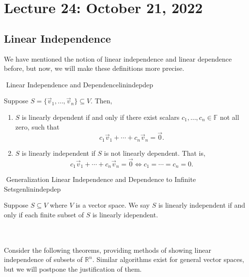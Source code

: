 \pagebreak

\section{Lecture 24: October 21, 2022}

    \subsection{Linear Independence}

        We have mentioned the notion of linear independence and linear dependence before, but now, we will make these definitions more precise.
        \begin{definition}{\Stop\,\,Linear Independence and Dependence}{linindepdep}
            
            Suppose \(S=\{\vec{v}_1,\ldots,\vec{v}_n\}\subseteq V\). Then,
            \begin{enumerate}
                \item \(S\) is linearly dependent if and only if there exist scalars \(c_1,\ldots,c_n\in\mathbb{F}\) not all zero, such that
                \begin{equation*}
                    c_1\vec{v}_1+\cdots+c_n\vec{v}_n=\vec{0}.
                \end{equation*}
                \item \(S\) is linearly independent if \(S\) is not linearly dependent. That is,
                \begin{equation*}
                    c_1\vec{v}_1+\cdots+c_n\vec{v}_n=\vec{0} \iff c_1=\cdots=c_n=0.
                \end{equation*}
            \end{enumerate}

        \end{definition}
        \begin{definition}{\Stop\,\,Generalization Linear Independence and Dependence to Infinite Sets}{genlinindepdep}
            
            Suppose \(S\subseteq V\) where \(V\) is a vector space. We say \(S\) is linearly independent if and only if each finite subset of \(S\) is linearly idependent.

        \end{definition}
        \vphantom
        \\
        \\
        Consider the following theorems, providing methods of showing linear independence of subsets of \(\mathbb{R}^n\). Similar algorithms exist for general vector spaces, but we will postpone the justification of them.
